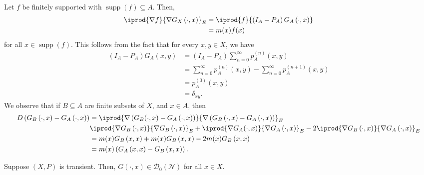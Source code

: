 \documentclass[10pt]{mypackage}
\begin{document}
Let $f$ be finitely supported with $\operatorname{supp}\left( f \right)\subseteq A$. Then,
\begin{align*}
  \iprod{ \nabla f }{\nabla G_X\left( \cdot,x \right)}_E &= \iprod{f}{\left( I_A - P_A \right)G_A\left( \cdot,x \right)}\\
                                                         &= m(x)f(x)
\end{align*}
for all $x\in \operatorname{supp}\left( f \right)$. This follows from the fact that for every $x,y\in X$, we have
\begin{align*}
  \left( I_A-P_A \right)G_A\left( x,y \right) &= \left( I_A-P_A \right)\sum_{n=0}^{\infty} p_A^{(n)}\left( x,y \right)\\
                                              &= \sum_{n=0}^{\infty}p_A^{(n)}\left( x,y \right) - \sum_{n=0}^{\infty}p_A^{(n+1)}\left( x,y \right)\\
                                              &= p_A^{(0)}\left( x,y \right)\\
                                              &= \delta_{xy}.
\end{align*}
We observe that if $B\subseteq A$ are finite subsets of $X$, and $x\in A$, then
\begin{align*}
  D\left( G_B\left( \cdot,x \right) - G_A\left( \cdot,x \right) \right) &= \iprod{\nabla \left( G_B(\cdot ,x) - G_A\left( \cdot,x \right) \right)}{ \nabla\left( G_B\left( \cdot,x \right) - G_A\left( \cdot,x \right) \right) }_{E}\\
                      & \iprod{\nabla G_B\left( \cdot,x \right)}{\nabla G_B\left( \cdot,x \right)}_{E} + \iprod{\nabla G_A(\cdot,x)}{\nabla G_A\left( \cdot,x \right)}_{E} - 2 \iprod{\nabla G_B\left( \cdot,x \right)}{\nabla G_A\left( \cdot,x \right)}_{E}\\
                      &= m(x)G_B\left( x,x \right) + m(x)G_B\left( x,x \right) - 2m(x)G_B\left( x,x \right)\\
                      &= m(x)\left( G_A\left( x,x \right) - G_B\left( x,x \right) \right).
\end{align*}
\begin{lemma}
  Suppose $\left( X,P \right)$ is transient. Then, $G\left( \cdot,x \right)\in \mathcal{D}_0\left( \mathcal{N} \right)$ for all $x\in X$.
\end{lemma}
\end{document}
